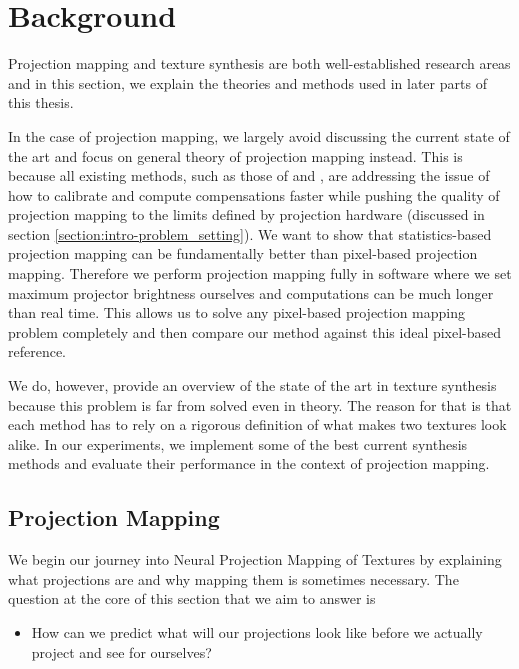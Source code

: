 \chapter{Background}
\label{chapter:background} 


Projection mapping and texture synthesis are both well-established research areas and in this section, we explain the theories and methods used in later parts of this thesis.

In the case of projection mapping, we largely avoid discussing the current state of the art and focus on general theory of projection mapping instead. This is because all existing methods, such as those of \citet{Siegl2017} and \citet{Willi2017}, are addressing the issue of how to calibrate and compute compensations faster while pushing the quality of projection mapping to the limits defined by projection hardware (discussed in section \ref{section:intro-problem_setting}). We want to show that statistics-based projection mapping can be fundamentally better than pixel-based projection mapping. Therefore we perform projection mapping fully in software where we set maximum projector brightness ourselves and computations can be much longer than real time. This allows us to solve any pixel-based projection mapping problem completely and then compare our method against this ideal pixel-based reference.

We do, however, provide an overview of the state of the art in texture synthesis because this problem is far from solved even in theory. The reason for that is that each method has to rely on a rigorous definition of what makes two textures look alike. In our experiments, we implement some of the best current synthesis methods and evaluate their performance in the context of projection mapping.

\section{Projection Mapping}
\label{section:background-projection_mapping}

We begin our journey into Neural Projection Mapping of Textures by explaining what projections are and why mapping them is sometimes necessary. The question at the core of this section that we aim to answer is

\begin{itemize}
    \item How can we predict what will our projections look like before we actually project and see for ourselves?
\end{itemize}

